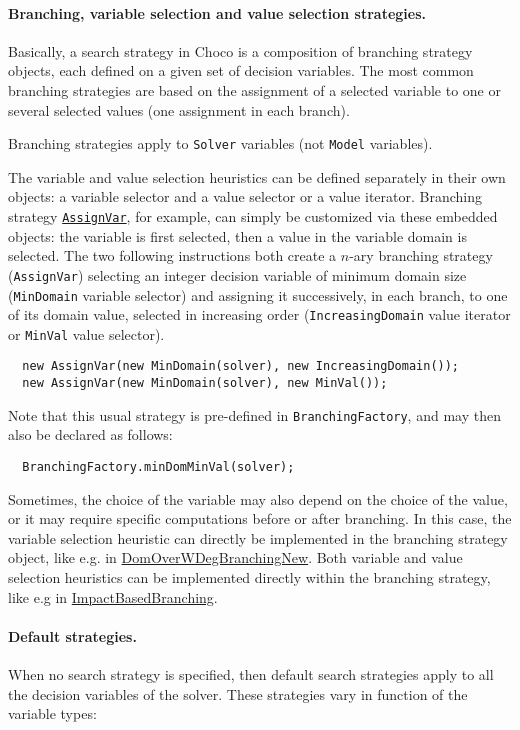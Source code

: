 \paragraph{Branching, variable selection and value selection strategies.}
Basically, a search strategy in Choco is a composition of \gls{branching strategy} objects, each defined on a given set of decision variables.
The most common branching strategies are based on the assignment of a selected variable to one or several selected values (one assignment in each branch). 
\begin{note}
Branching strategies apply to \texttt{Solver} variables (not \texttt{Model} variables).
\end{note}
The variable and value selection heuristics can be defined separately in their own objects: a \gls{variable selector} and a \gls{value selector} or a \gls{value iterator}. 
Branching strategy \hyperlink{assignvar:assignvarbranchstrat}{\tt AssignVar}, for example, can simply be customized via these embedded objects: the variable is first selected, then a value in the variable domain is selected. The two following instructions both create a $n$-ary branching strategy (\texttt{AssignVar}) selecting an integer decision variable of minimum domain size (\texttt{MinDomain} variable selector) and assigning it successively, in each branch, to one of its domain value, selected in increasing order (\texttt{IncreasingDomain} value iterator or \texttt{MinVal} value selector).
\begin{lstlisting}
  new AssignVar(new MinDomain(solver), new IncreasingDomain());
  new AssignVar(new MinDomain(solver), new MinVal());
\end{lstlisting}
Note that this usual strategy is pre-defined in \texttt{BranchingFactory}, and may then also be declared as follows:
\begin{lstlisting}
  BranchingFactory.minDomMinVal(solver);
\end{lstlisting}
Sometimes, the choice of the variable may also depend on the choice of the value, or it may require specific computations before or after branching. In this case, the variable selection heuristic can directly be implemented in the branching strategy object, like e.g. in \hyperlink{domoverwdeg:domoverwdegbranchstrat}{DomOverWDegBranchingNew}. Both variable and value selection heuristics can be implemented directly within the branching strategy, like e.g in \hyperlink{impact:impactbranchstrat}{ImpactBasedBranching}.

\paragraph{Default strategies.}
When no search strategy is specified, then default search strategies apply to all the decision variables of the solver.
These strategies vary in function of the variable types: 

